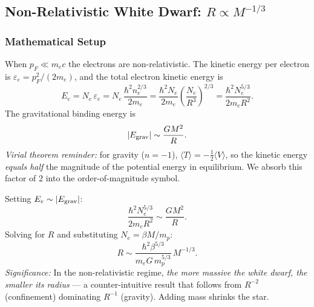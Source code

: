\subsection{Non-Relativistic White Dwarf: $R \propto M^{-1/3}$}
\label{sec:lec10:wd-nr}

\subsubsection*{Mathematical Setup}

When $p_F \ll m_e c$ the electrons are non-relativistic. The kinetic energy per
electron is $\varepsilon_e = p_F^2/(2m_e)$, and the total electron kinetic
energy is
\begin{equation}
    E_e = N_e\,\varepsilon_e
    = N_e\,\frac{\hbar^2 n_e^{2/3}}{2m_e}
    = \frac{\hbar^2 N_e}{2m_e}\left(\frac{N_e}{R^3}\right)^{2/3}
    = \frac{\hbar^2 N_e^{5/3}}{2m_e R^2}.
    \label{eq:lec10:Ee-nr}
\end{equation}
The gravitational binding energy is
\begin{equation}
    |E_{\rm grav}| \sim \frac{G M^2}{R}.
    \label{eq:lec10:Egrav}
\end{equation}
\textit{Virial theorem reminder:} for gravity ($n=-1$), $\langle T\rangle =
-\tfrac{1}{2}\langle V\rangle$, so the kinetic energy \emph{equals half} the
magnitude of the potential energy in equilibrium. We absorb this factor of 2
into the order-of-magnitude symbol.

Setting $E_e \sim |E_{\rm grav}|$:
\begin{equation}
    \frac{\hbar^2 N_e^{5/3}}{2m_e R^2} \sim \frac{GM^2}{R}.
    \label{eq:lec10:equip-nr}
\end{equation}
Solving for $R$ and substituting $N_e = \beta M/m_p$:
\begin{equation}
    \boxed{
    R \sim \frac{\hbar^2 \beta^{5/3}}{m_e G\,m_p^{5/3}}\,M^{-1/3}.
    }
    \label{eq:lec10:R-nr}
\end{equation}
\textit{Significance:} In the non-relativistic regime, \emph{the more massive
the white dwarf, the smaller its radius} — a counter-intuitive result that
follows from $R^{-2}$ (confinement) dominating $R^{-1}$ (gravity). Adding mass
shrinks the star.


